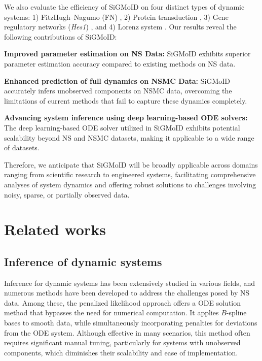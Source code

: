\documentclass[letterpaper]{article} %
\theoremstyle{thmstyleone}%
\theoremstyle{thmstyletwo}%
\theoremstyle{thmstylethree}%
\begin{document}
We also evaluate the efficiency of SiGMoID on four distinct types of dynamic systems: 1) FitzHugh–Nagumo (FN) \cite{fitzhugh1961impulses}, 2) Protein transduction \cite{vyshemirsky2008bayesian}, 3) Gene regulatory networks (\textit{Hes1}) \cite{hirata2002oscillatory}, and 4) Lorenz system \cite{lorenz2017deterministic,stepaniants2024discovering}. Our results reveal the following contributions of SiGMoID:

\textbf{Improved parameter estimation on NS Data:} SiGMoID exhibits superior parameter estimation accuracy compared to existing methods on NS data.

\textbf{Enhanced prediction of full dynamics on NSMC Data:} SiGMoID accurately infers unobserved components on NSMC data, overcoming the limitations of current methods that fail to capture these dynamics completely.

\textbf{Advancing system inference using deep learning-based ODE solvers:} The deep learning-based ODE solver utilized in SiGMoID exhibits potential scalability beyond NS and NSMC datasets, making it applicable to a wide range of datasets.

Therefore, we anticipate that SiGMoID will be broadly applicable across domains ranging from scientific research to engineered systems, facilitating comprehensive analyses of system dynamics and offering robust solutions to challenges involving noisy, sparse, or partially observed data.

\section{Related works}
\subsection{Inference of dynamic systems}
Inference for dynamic systems has been extensively studied in various fields, and numerous methods have been developed to address the challenges posed by NS data. Among these, the penalized likelihood approach \cite{ramsay2007parameter} offers a ODE solution method that bypasses the need for numerical computation. It applies $B$-spline bases to smooth data, while simultaneously incorporating penalties for deviations from the ODE system. Although effective in many scenarios, this method often requires significant manual tuning, particularly for systems with unobserved components, which diminishes their scalability and ease of implementation.
\end{document}
